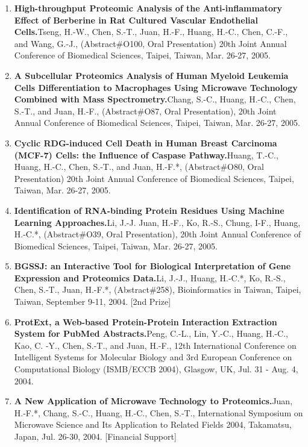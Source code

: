 \documentclass[10pt,a4paper]{article}
\def\newpub#1#2#3{{\boldmath \bf #2.}\newline #1, #3.}
\begin{document}
\begin{enumerate}
\item
\newpub
{Tseng, H.-W., Chen, S.-T., Juan, H.-F., Huang, H.-C., Chen, C.-F., and Wang, G.-J.}
{High-throughput Proteomic Analysis of the Anti-inflammatory Effect of Berberine in Rat Cultured Vascular Endothelial Cells}
{(Abstract\#O100, Oral Presentation) 20th Joint Annual Conference of Biomedical Sciences, Taipei, Taiwan, Mar. 26-27, 2005}

\item
\newpub
{Chang, S.-C., Huang, H.-C., Chen, S.-T., and Juan, H.-F.}
{A Subcellular Proteomics Analysis of Human Myeloid Leukemia Cells Differentiation to Macrophages Using Microwave Technology Combined with Mass Spectrometry}
{(Abstract\#O87, Oral Presentation), 20th Joint Annual Conference of Biomedical Sciences, Taipei, Taiwan, Mar. 26-27, 2005}

\item
\newpub
{Huang, T.-C., Huang, H.-C., Chen, S.-T., and Juan, H.-F.*}
{Cyclic RDG-induced Cell Death in Human Breast Carcinoma (MCF-7) Cells: the Influence of Caspase Pathway}
{(Abstract\#O80, Oral Presentation) 20th Joint Annual Conference of Biomedical Sciences, Taipei, Taiwan, Mar. 26-27, 2005}

\item
\newpub
{Li, J.-J. Juan, H.-F., Ko, R.-S., Chung, I-F., Huang, H.-C.*}
{Identification of RNA-binding Protein Residues Using Machine Learning Approaches}
{(Abstract\#O39, Oral Presentation), 20th Joint Annual Conference of Biomedical Sciences, Taipei, Taiwan, Mar. 26-27, 2005}

\item
\newpub
{Li, J.-J., Huang, H.-C.*, Ko, R.-S., Chen, S.-T., Juan, H.-F.*}
{BGSSJ: an Interactive Tool for Biological Interpretation of Gene Expression and Proteomics Data}
{(Abstract\#258), Bioinformatics in Taiwan, Taipei, Taiwan, September 9-11, 2004}
[2nd Prize]

\item
\newpub
{Peng, C.-L., Lin, Y.-C., Huang, H.-C., Kao, C. -Y., Chen, S.-T., and Juan, H.-F.}
{ProtExt, a Web-based Protein-Protein Interaction Extraction System for PubMed Abstracts}
{12th International Conference on Intelligent Systems for Molecular Biology and 3rd European Conference on Computational Biology (ISMB/ECCB 2004), Glasgow, UK, Jul. 31 - Aug. 4, 2004}

\item
\newpub
{Juan, H.-F.*, Chang, S.-C., Huang, H.-C., Chen, S.-T.}
{A New Application of Microwave Technology to Proteomics}
{International Symposium on Microwave Science and Its Application to Related Fields 2004, Takamatsu, Japan, Jul. 26-30, 2004}
[Financial Support]


\end{enumerate}
\end{document}
